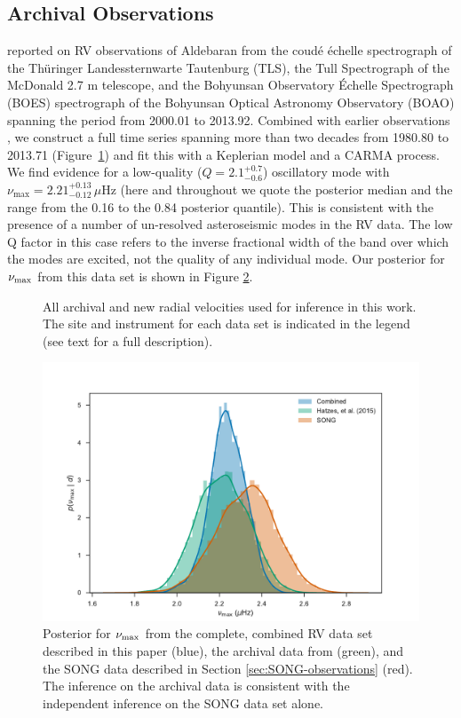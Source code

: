 \documentclass[modern]{aastex61}
\newcommand{\numax}{\mbox{$\nu_{\rm max}$}\xspace}
\newcommand{\twosidedrange}[3]{\ensuremath{#1^{+#2}_{-#3}}}
\newcommand{\HatzesQRange}{\twosidedrange{2.1}{0.7}{0.6}}
\newcommand{\HatzesNuMaxRange}{\twosidedrange{2.21}{0.13}{0.12}}
\begin{document}
\subsection{Archival Observations}
\label{sec:archival-obs}

\citet{Hatzes2015} reported on RV observations of Aldebaran from the coud\'{e}
\'{e}chelle spectrograph of the Th\"{u}ringer Landessternwarte Tautenburg (TLS),
the Tull Spectrograph of the McDonald 2.7 m telescope, and the Bohyunsan
Observatory \'{E}chelle Spectrograph (BOES) spectrograph of the Bohyunsan
Optical Astronomy Observatory (BOAO) spanning the period from 2000.01 to
2013.92.  Combined with earlier observations \citep{hatzes1993}, we construct a
full time series spanning more than two decades from 1980.80 to 2013.71
(Figure~\ref{alldata}) and fit this with a Keplerian model and a CARMA process.
We find evidence for a low-quality ($Q = \HatzesQRange{}$) oscillatory mode with
$\nu_\mathrm{max} = \HatzesNuMaxRange{} \, \mu\mathrm{Hz}$ (here and throughout
we quote the posterior median and the range from the 0.16 to the 0.84 posterior
quantile).  This is consistent with the presence of a number of un-resolved
asteroseismic modes in the RV data.  The low Q factor in this case refers to the
inverse fractional width of the band over which the modes are excited, not the
quality of any individual mode.  Our posterior for \numax{} from this data set
is shown in Figure \ref{fig:numax-datasets}.

\begin{figure}
\centering
{}
\caption{All archival and new radial velocities used for inference in this work.  The site and instrument for each data set is indicated in the legend (see text for a full description).}
\label{alldata}
\end{figure}

\begin{figure}
  \includegraphics[width=\columnwidth]{numax}
  \caption{Posterior for \numax{} from the complete, combined RV data set described in this paper (blue), the archival data from \citet{Hatzes2015} (green), and the SONG data described in Section \ref{sec:SONG-observations} (red).  The inference on the archival data is consistent with the independent inference on the SONG data set alone.}
  \label{fig:numax-datasets}
\end{figure}
\end{document}
